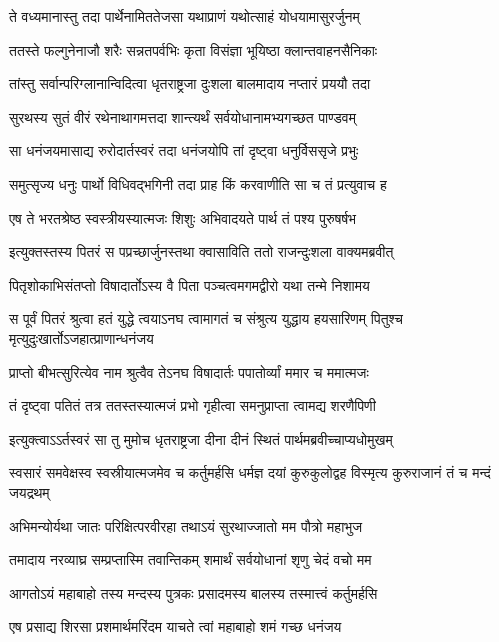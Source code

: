 \twolineshloka
{ते वध्यमानास्तु तदा पार्थेनामिततेजसा}
{यथाप्राणं यथोत्साहं योधयामासुरर्जुनम्}


\twolineshloka
{ततस्ते फल्गुनेनाजौ शरैः सन्नतपर्वभिः}
{कृता विसंज्ञा भूयिष्ठा क्लान्तवाहनसैनिकाः}


\twolineshloka
{तांस्तु सर्वान्परिग्लानान्विदित्वा धृतराष्ट्रजा}
{दुःशला बालमादाय नप्तारं प्रययौ तदा}


\twolineshloka
{सुरथस्य सुतं वीरं रथेनाथागमत्तदा}
{शान्त्यर्थं सर्वयोधानामभ्यगच्छत पाण्डवम्}


\twolineshloka
{सा धनंजयमासाद्य रुरोदार्तस्वरं तदा}
{धनंजयोपि तां दृष्ट्वा धनुर्विससृजे प्रभुः}


\twolineshloka
{समुत्सृज्य धनुः पार्थो विधिवद्भगिनी तदा}
{प्राह किं करवाणीति सा च तं प्रत्युवाच ह}


\twolineshloka
{एष ते भरतश्रेष्ठ स्वस्त्रीयस्यात्मजः शिशुः}
{अभिवादयते पार्थ तं पश्य पुरुषर्षभ}


\twolineshloka
{इत्युक्तस्तस्य पितरं स पप्रच्छार्जुनस्तथा}
{क्वासाविति ततो राजन्दुःशला वाक्यमब्रवीत्}


\twolineshloka
{पितृशोकाभिसंतप्तो विषादार्तोऽस्य वै पिता}
{पञ्चत्वमगमद्वीरो यथा तन्मे निशामय}


\threelineshloka
{स पूर्वं पितरं श्रुत्वा हतं युद्धे त्वयाऽनघ}
{त्वामागतं च संश्रुत्य युद्धाय हयसारिणम्}
{पितुश्च मृत्युदुःखार्तोऽजहात्प्राणान्धनंजय}


\twolineshloka
{प्राप्तो बीभत्सुरित्येव नाम श्रुत्वैव तेऽनघ}
{विषादार्तः पपातोर्व्यां ममार च ममात्मजः}


\twolineshloka
{तं दृष्ट्वा पतितं तत्र ततस्तस्यात्मजं प्रभो}
{गृहीत्वा समनुप्राप्ता त्वामद्य शरणैपिणी}


\twolineshloka
{इत्युक्त्वाऽऽर्तस्वरं सा तु मुमोच धृतराष्ट्रजा}
{दीना दीनं स्थितं पार्थमब्रवीच्चाप्यधोमुखम्}


\threelineshloka
{स्वसारं समवेक्षस्व स्वस्रीयात्मजमेव च}
{कर्तुमर्हसि धर्मज्ञ दयां कुरुकुलोद्वह}
{विस्मृत्य कुरुराजानं तं च मन्दं जयद्रथम्}


\twolineshloka
{अभिमन्योर्यथा जातः परिक्षित्परवीरहा}
{तथाऽयं सुरथाज्जातो मम पौत्रो महाभुज}


\twolineshloka
{तमादाय नरव्याघ्र सम्प्रप्तास्मि तवान्तिकम्}
{शमार्थं सर्वयोधानां शृणु चेदं वचो मम}


\twolineshloka
{आगतोऽयं महाबाहो तस्य मन्दस्य पुत्रकः}
{प्रसादमस्य बालस्य तस्मात्त्वं कर्तुमर्हसि}


\twolineshloka
{एष प्रसाद्य शिरसा प्रशमार्थमरिंदम}
{याचते त्वां महाबाहो शमं गच्छ धनंजय}


